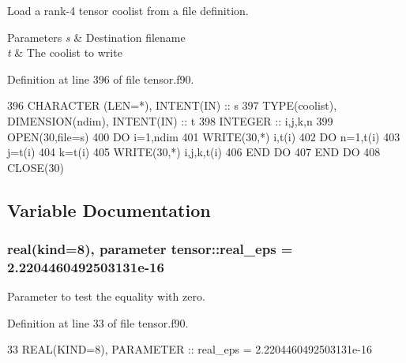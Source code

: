 Load a rank-\/4 tensor coolist from a file definition. 


\begin{DoxyParams}{Parameters}
{\em s} & Destination filename \\
\hline
{\em t} & The coolist to write \\
\hline
\end{DoxyParams}


Definition at line 396 of file tensor.\+f90.


\begin{DoxyCode}
396     \textcolor{keywordtype}{CHARACTER (LEN=*)}, \textcolor{keywordtype}{INTENT(IN)} :: s
397     \textcolor{keywordtype}{TYPE}(coolist), \textcolor{keywordtype}{DIMENSION(ndim)}, \textcolor{keywordtype}{INTENT(IN)} :: t
398     \textcolor{keywordtype}{INTEGER} :: i,j,k,n
399     \textcolor{keyword}{OPEN}(30,file=s)
400     \textcolor{keywordflow}{DO} i=1,ndim
401        \textcolor{keyword}{WRITE}(30,*) i,t(i)%
402        \textcolor{keywordflow}{DO} n=1,t(i)%
403           j=t(i)%
404           k=t(i)%
405           \textcolor{keyword}{WRITE}(30,*) i,j,k,t(i)%
406 \textcolor{keywordflow}{       END DO}
407 \textcolor{keywordflow}{    END DO}
408     \textcolor{keyword}{CLOSE}(30)
\end{DoxyCode}


\subsection{Variable Documentation}
\subsubsection[{\texorpdfstring{real\+\_\+eps}{real_eps}}]{\setlength{\rightskip}{0pt plus 5cm}real(kind=8), parameter tensor\+::real\+\_\+eps = 2.\+2204460492503131e-\/16}\hypertarget{namespacetensor_a2a2ab182d86107e62533c3f0043652cc}{}\label{namespacetensor_a2a2ab182d86107e62533c3f0043652cc}


Parameter to test the equality with zero. 



Definition at line 33 of file tensor.\+f90.


\begin{DoxyCode}
33   \textcolor{keywordtype}{REAL(KIND=8)}, \textcolor{keywordtype}{PARAMETER} :: real\_eps = 2.2204460492503131e-16
\end{DoxyCode}
